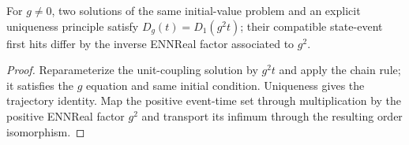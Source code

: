 \begin{theorem}
\label{thm:physics:kinetic_time_rescaling:target}
For $g\ne0$, two solutions of the same initial-value problem and an explicit uniqueness principle satisfy $D_g(t)=D_1(g^2t)$; their compatible state-event first hits differ by the inverse ENNReal factor associated to $g^2$.
\end{theorem}
\begin{proof}
Reparameterize the unit-coupling solution by $g^2t$ and apply the chain rule; it satisfies the $g$ equation and same initial condition. Uniqueness gives the trajectory identity. Map the positive event-time set through multiplication by the positive ENNReal factor $g^2$ and transport its infimum through the resulting order isomorphism.
\end{proof}
